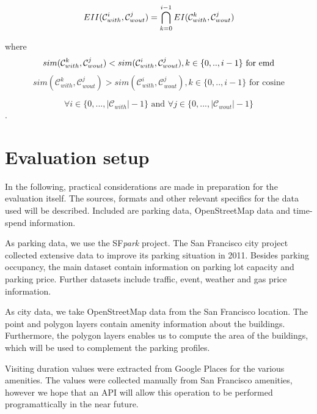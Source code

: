 \documentclass{ws-ijait}
\begin{document}
	\begin{equation}
	EII(\mathcal{C}_{with}^i,\mathcal{C}_{wout}^j) = \bigcap_{k=0}^{i-1} EI(\mathcal{C}_{with}^k,\mathcal{C}_{wout}^j) \\
	\end{equation}
	
	where
	\begin{equation}
	sim(\mathcal{C}_{with}^k,\mathcal{C}_{wout}^j) < sim(\mathcal{C}_{with}^i,\mathcal{C}_{wout}^j), k \in \{0,..,i - 1\} \text{ for emd}\\
	\end{equation}
	\begin{equation}
	sim(\mathcal{C}_{with}^k,\mathcal{C}_{wout}^j) > sim(\mathcal{C}_{with}^i,\mathcal{C}_{wout}^j), k \in \{0,..,i - 1\} \text{ for cosine} 
	\end{equation}
	
	$$\forall i \in \{0,...,|\mathcal{C}_{with}|-1\} \text{ and } \forall j \in \{0,...,|\mathcal{C}_{wout}|-1\}$$.
	
	\section{Evaluation setup}
	In the following, practical considerations are made in preparation for the evaluation itself. The sources, formats and other relevant specifics for the data used will be described. Included are parking data, OpenStreetMap data and time-spend information.
	
	As parking data, we use the SF\textit{park} project. The San Francisco city project collected extensive data to improve its parking situation in 2011. Besides parking occupancy, the main dataset contain information on parking lot capacity and parking price. Further datasets include traffic, event, weather and gas price information.
	
	As city data, we take OpenStreetMap data from the San Francisco location. The point and polygon layers contain amenity information about the buildings. Furthermore, the polygon layers enables us to compute the area of the buildings, which will be used to complement the parking profiles.
	
	Visiting duration values were extracted from Google Places for the various amenities. The values were collected manually from San Francisco amenities, however we hope that an API will allow this operation to be performed programattically in the near future.
	
\end{document}
